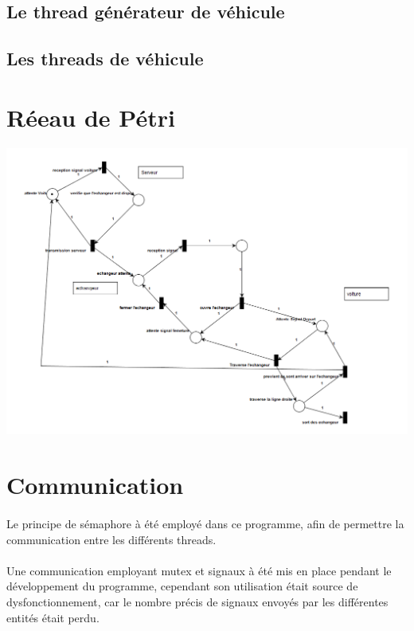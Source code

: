 \documentclass{report}
\begin{document}
	\subsection{Le thread générateur de véhicule}
	
	\subsection{Les threads de véhicule}
	
	\newpage
	\section{Réeau de Pétri}
	\begin{center}
	\includegraphics[scale=0.4]{Petri}
	\end{center}
	
		\newpage
	
	\section{Communication}
	\paragraph{}
	Le principe de sémaphore à été employé dans ce programme, afin de permettre la communication entre les différents threads. 
	\paragraph{}
	Une communication employant mutex et signaux à été mis en place pendant le développement du programme, cependant son utilisation était source de dysfonctionnement, car le nombre précis de signaux envoyés par les différentes entités était perdu.
\end{document}
